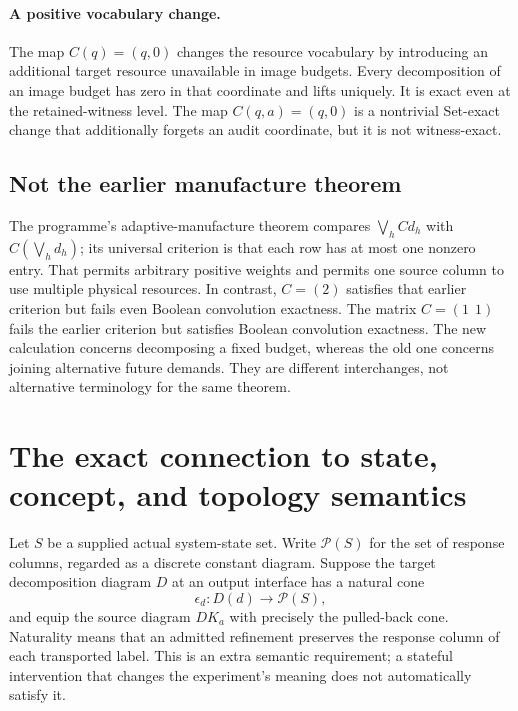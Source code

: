 \documentclass[11pt]{article}
\theoremstyle{definition}\newtheorem{definition}[theorem]{Definition}
\theoremstyle{remark}\newtheorem{remark}[theorem]{Remark}
\begin{document}
\paragraph{A positive vocabulary change.}
The map $C(q)=(q,0)$ changes the resource vocabulary by introducing an
additional target resource unavailable in image budgets. Every decomposition
of an image budget has zero in that coordinate and lifts uniquely. It is
exact even at the retained-witness level. The map $C(q,a)=(q,0)$ is a
nontrivial Set-exact change that additionally forgets an audit coordinate,
but it is not witness-exact.

\subsection{Not the earlier manufacture theorem}
The programme's adaptive-manufacture theorem compares
$\bigvee_h Cd_h$ with $C(\bigvee_h d_h)$; its universal criterion is
that each row has at most one nonzero entry. That permits arbitrary
positive weights and permits one source column to use multiple physical
resources. In contrast, $C=(2)$ satisfies that earlier criterion but
fails even Boolean convolution exactness. The matrix $C=(1\ \ 1)$
fails the earlier criterion but satisfies Boolean convolution exactness.
The new calculation concerns decomposing a fixed budget, whereas the old
one concerns joining alternative future demands. They are different
interchanges, not alternative terminology for the same theorem.

\section{The exact connection to state, concept, and topology semantics}
Let $S$ be a supplied actual system-state set. Write $\mathcal P(S)$
for the set of response columns, regarded as a discrete constant diagram.
Suppose the target decomposition diagram $D$ at an output interface has
a natural cone
\[
 \epsilon_d:D(d)\longrightarrow\mathcal P(S),
\]
and equip the source diagram $DK_a$ with precisely the pulled-back cone.
Naturality means that an admitted refinement preserves the response
column of each transported label. This is an extra semantic requirement;
a stateful intervention that changes the experiment's meaning does not
automatically satisfy it.
\end{document}
